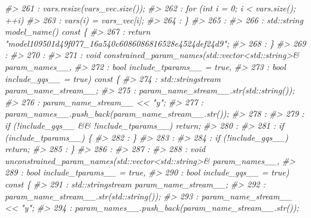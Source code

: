 \documentclass[
  10pt,
  italian,
  a4paper,
  extrafontsizes,onecolumn,openright
  ]{memoir}
\newenvironment{Shaded}{\begin{snugshade}}{\end{snugshade}}
\newcommand{\CommentTok}[1]{\textcolor[rgb]{0.56,0.35,0.01}{\textit{#1}}}
\begin{document}
\begin{Shaded}
\begin{Highlighting}[]
\CommentTok{\#\textgreater{}  261 :       vars.resize(vars\_vec.size());}
\CommentTok{\#\textgreater{}  262 :       for (int i = 0; i \textless{} vars.size(); ++i)}
\CommentTok{\#\textgreater{}  263 :         vars(i) = vars\_vec[i];}
\CommentTok{\#\textgreater{}  264 :     \}}
\CommentTok{\#\textgreater{}  265 : }
\CommentTok{\#\textgreater{}  266 :     std::string model\_name() const \{}
\CommentTok{\#\textgreater{}  267 :         return "model109501d49f077\_16a540c6086086816528e4524def24d9";}
\CommentTok{\#\textgreater{}  268 :     \}}
\CommentTok{\#\textgreater{}  269 : }
\CommentTok{\#\textgreater{}  270 : }
\CommentTok{\#\textgreater{}  271 :     void constrained\_param\_names(std::vector\textless{}std::string\textgreater{}\& param\_names\_\_,}
\CommentTok{\#\textgreater{}  272 :                                  bool include\_tparams\_\_ = true,}
\CommentTok{\#\textgreater{}  273 :                                  bool include\_gqs\_\_ = true) const \{}
\CommentTok{\#\textgreater{}  274 :         std::stringstream param\_name\_stream\_\_;}
\CommentTok{\#\textgreater{}  275 :         param\_name\_stream\_\_.str(std::string());}
\CommentTok{\#\textgreater{}  276 :         param\_name\_stream\_\_ \textless{}\textless{} "y";}
\CommentTok{\#\textgreater{}  277 :         param\_names\_\_.push\_back(param\_name\_stream\_\_.str());}
\CommentTok{\#\textgreater{}  278 : }
\CommentTok{\#\textgreater{}  279 :         if (!include\_gqs\_\_ \&\& !include\_tparams\_\_) return;}
\CommentTok{\#\textgreater{}  280 : }
\CommentTok{\#\textgreater{}  281 :         if (include\_tparams\_\_) \{}
\CommentTok{\#\textgreater{}  282 :         \}}
\CommentTok{\#\textgreater{}  283 : }
\CommentTok{\#\textgreater{}  284 :         if (!include\_gqs\_\_) return;}
\CommentTok{\#\textgreater{}  285 :     \}}
\CommentTok{\#\textgreater{}  286 : }
\CommentTok{\#\textgreater{}  287 : }
\CommentTok{\#\textgreater{}  288 :     void unconstrained\_param\_names(std::vector\textless{}std::string\textgreater{}\& param\_names\_\_,}
\CommentTok{\#\textgreater{}  289 :                                    bool include\_tparams\_\_ = true,}
\CommentTok{\#\textgreater{}  290 :                                    bool include\_gqs\_\_ = true) const \{}
\CommentTok{\#\textgreater{}  291 :         std::stringstream param\_name\_stream\_\_;}
\CommentTok{\#\textgreater{}  292 :         param\_name\_stream\_\_.str(std::string());}
\CommentTok{\#\textgreater{}  293 :         param\_name\_stream\_\_ \textless{}\textless{} "y";}
\CommentTok{\#\textgreater{}  294 :         param\_names\_\_.push\_back(param\_name\_stream\_\_.str());}

\end{Highlighting}
\end{Shaded}
\end{document}
